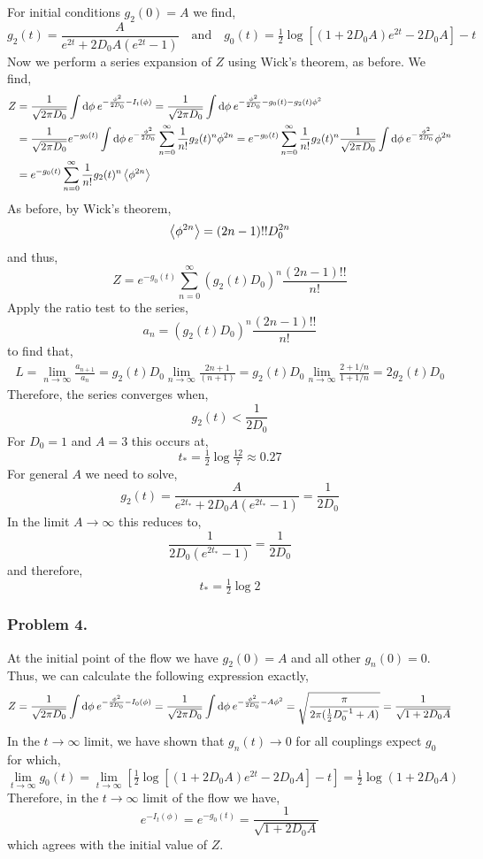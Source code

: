 \documentclass[12pt]{article}
\begin{document}
For initial conditions $g_2(0) = A$ we find,
\[ g_2(t) = \frac{A}{e^{2 t} + 2 D_0 A (e^{2 t} - 1)} \quad \text{and} \quad g_0(t) = \tfrac{1}{2} \log{[(1 + 2 D_0 A) e^{2 t} - 2 D_0 A]} - t \]
Now we perform a series expansion of $Z$ using Wick's theorem, as before. We find,
\begin{align*}
Z & = \frac{1}{\sqrt{2 \pi D_0}} \int \mathrm{d}\phi \: e^{-\frac{\phi^2}{2 D_0} - I_t(\phi)} = \frac{1}{\sqrt{2 \pi D_0}} \int \mathrm{d}\phi \: e^{-\frac{\phi^2}{2 D_0} - g_0(t) - g_2(t) \phi^2}
\\
& = \frac{1}{\sqrt{2 \pi D_0}} e^{- g_0(t)} \int \mathrm{d}\phi \: e^{-\frac{\phi^2}{2 D_0}} \sum_{n = 0}^\infty \frac{1}{n!} g_2(t)^n \phi^{2n} 
=  e^{- g_0(t)} \sum_{n = 0}^\infty \frac{1}{n!} g_2(t)^n \frac{1}{\sqrt{2 \pi D_0}} \int \mathrm{d}\phi \: e^{-\frac{\phi^2}{2 D_0}}  \phi^{2n} 
\\
& = e^{- g_0(t)} \sum_{n = 0}^\infty \frac{1}{n!} g_2(t)^n \left< \phi^{2n} \right>
\end{align*}
As before, by Wick's theorem, 
\[ \left< \phi^{2n} \right> = (2n - 1)!! D_0^{2n} \]
and thus,
\[ Z = e^{- g_0(t)} \sum_{n = 0}^\infty (g_2(t) D_0)^n \frac{(2 n - 1)!!}{n!} \]
Apply the ratio test to the series,
\[ a_n =  (g_2(t) D_0)^n \frac{(2 n - 1)!!}{n!} \]
to find that,
\begin{align*}
L = \lim_{n \to \infty} \frac{a_{n+1}}{a_n} = g_2(t) D_0 \lim_{n \to \infty}  \frac{2 n + 1}{(n + 1)} = g_2(t) D_0 \lim_{n \to \infty} \frac{2 + 1/n}{1 + 1/n} = 2 g_2(t) D_0
\end{align*}
Therefore, the series converges when,
\[ g_2(t) < \frac{1}{2D_0} \]
For $D_0 = 1$ and $A = 3$ this occurs at,
\[ 
t_* = \tfrac{1}{2} \log{\tfrac{12}{7}} \approx 0.27 \]
For general $A$ we need to solve,
\[ g_2(t) = \frac{A}{e^{2t_*} + 2 D_0 A (e^{2 t_*} - 1)} = \frac{1}{2D_0} \]
In the limit $A \to \infty$ this reduces to,
\[ \frac{1}{2 D_0(e^{2 t_*} - 1)} = \frac{1}{2 D_0} \]
and therefore,
\[ t_* = \tfrac{1}{2} \log{2} \] 

\subsubsection{Problem 4.}

At the initial point of the flow we have $g_2(0) = A$ and all other $g_n(0) = 0$. Thus, we can calculate the following expression exactly,
\[ Z = \frac{1}{\sqrt{2 \pi D_0}} \int \mathrm{d}\phi \: e^{- \frac{\phi^2}{2 D_0} - I_0(\phi) } = \frac{1}{\sqrt{2 \pi D_0}} \int \mathrm{d}\phi \: e^{- \frac{\phi^2}{2 D_0} - A \phi^2 } = \sqrt{\frac{\pi}{2 \pi (\tfrac{1}{2} D_0^{-1} + A)}} = \frac{1}{\sqrt{1 + 2 D_0 A}} \]
In the $t \to \infty$ limit, we have shown that $g_n(t) \to 0$ for all couplings expect $g_0$ for which,
\[ \lim_{t \to \infty} g_0(t) = \lim_{t \to \infty} \left[ \tfrac{1}{2} \log{[(1 + 2 D_0 A)e^{2t} - 2 D_0 A] } - t \right] = \tfrac{1}{2} \log{(1 + 2 D_0 A)} \] 
Therefore, in the $t \to \infty$ limit of the flow we have,
\[ e^{-I_t(\phi)} = e^{-g_0(t)} = \frac{1}{\sqrt{1 + 2 D_0 A}} \]
which agrees with the initial value of $Z$. 
\end{document}
